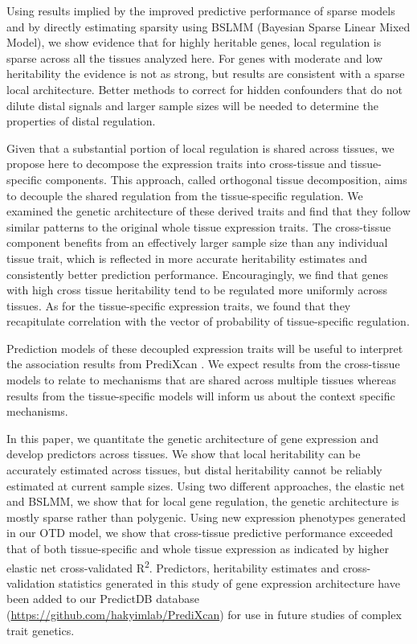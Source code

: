 \documentclass[10pt,letterpaper]{article}
\begin{document}
Using results implied by the improved predictive performance of sparse models and by directly estimating sparsity using BSLMM (Bayesian Sparse Linear Mixed Model), we show evidence that for highly heritable genes, local regulation is sparse across all the tissues analyzed here. For genes with moderate and low heritability the evidence is not as strong, but results are consistent with a sparse local architecture. Better methods to correct for hidden confounders that do not dilute distal signals and larger sample sizes will be needed to determine the properties of distal regulation. 

Given that a substantial portion of local regulation is shared across tissues, we propose here to decompose the expression traits into cross-tissue and tissue-specific components. This approach, called orthogonal tissue decomposition, aims to decouple the shared regulation from the tissue-specific regulation. We examined the genetic architecture of these derived traits and find that they follow similar patterns to the original whole tissue expression traits. The cross-tissue component benefits from an effectively larger sample size than any individual tissue trait, which is reflected in more accurate heritability estimates and consistently better prediction performance. Encouragingly, we find that genes with high cross tissue heritability tend to be regulated more uniformly across tissues. As for the tissue-specific expression traits, we found that they recapitulate correlation with the vector of probability of tissue-specific regulation. 

Prediction models of these decoupled expression traits will be useful to interpret the association results from PrediXcan \cite{Gamazon_2015}. We expect results from the cross-tissue models to relate to mechanisms that are shared across multiple tissues whereas results from the tissue-specific models will inform us about the context specific mechanisms. 

In this paper, we quantitate the genetic architecture of gene expression and develop predictors across tissues. We show that local heritability can be accurately estimated across tissues, but distal heritability cannot be reliably estimated at current sample sizes. Using two different approaches, the elastic net and BSLMM, we show that for local gene regulation, the genetic architecture is mostly sparse rather than polygenic. Using new expression phenotypes generated in our OTD model, we show that cross-tissue predictive performance exceeded that of both tissue-specific and whole tissue expression as indicated by higher elastic net cross-validated R\textsuperscript{2}. Predictors, heritability estimates and cross-validation statistics generated in this study of gene expression architecture have been added to our PredictDB database (\url{https://github.com/hakyimlab/PrediXcan}) for use in future studies of complex trait genetics.
\end{document}
